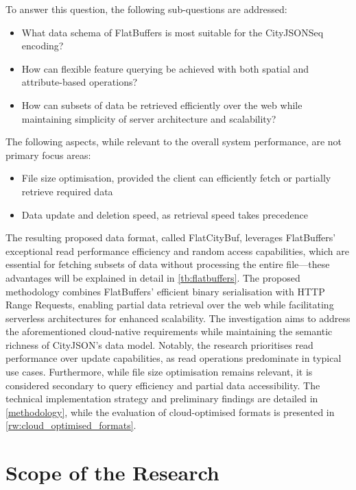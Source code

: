 To answer this question, the following sub-questions are addressed:
\begin{itemize}
  \item What data schema of FlatBuffers is most suitable for the CityJSONSeq encoding?
  \item How can flexible feature querying be achieved with both spatial and attribute-based operations?
  \item How can subsets of data be retrieved efficiently over the web while maintaining simplicity of server architecture and scalability?
\end{itemize}

The following aspects, while relevant to the overall system performance, are not primary focus areas:
\begin{itemize}
  \item File size optimisation, provided the client can efficiently fetch or partially retrieve required data
  \item Data update and deletion speed, as retrieval speed takes precedence
\end{itemize}

The resulting proposed data format, called FlatCityBuf, leverages FlatBuffers' exceptional read performance efficiency and random access capabilities, which are essential for fetching subsets of data without processing the entire file—these advantages will be explained in detail in \autoref{tb:flatbuffers}. The proposed methodology combines FlatBuffers' efficient binary serialisation with HTTP Range Requests, enabling partial data retrieval over the web while facilitating serverless architectures for enhanced scalability. The investigation aims to address the aforementioned cloud-native requirements while maintaining the semantic richness of CityJSON's data model. Notably, the research prioritises read performance over update capabilities, as read operations predominate in typical use cases. Furthermore, while file size optimisation remains relevant, it is considered secondary to query efficiency and partial data accessibility. The technical implementation strategy and preliminary findings are detailed in \autoref{methodology}, while the evaluation of cloud-optimised formats is presented in \autoref{rw:cloud_optimised_formats}.

\section{Scope of the Research}
\label{introduction:scope_of_the_research}

